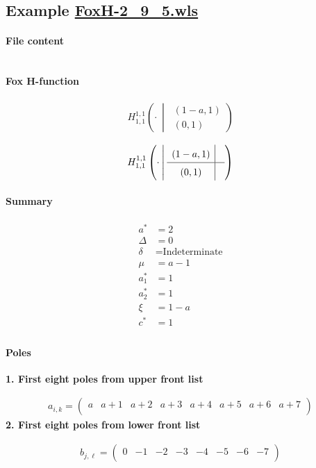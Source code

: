 \documentclass[preview]{standalone}
\newcommand{\FoxH}[5]{H_{#2}^{#1}\left(#3\:\middle\vert\: \begin{array}{l}#4\\[0.4em] #5\end{array}\right)}
\begin{document}
\subsection{Example \url{FoxH-2_9_5.wls}}

\paragraph{File content}

\inputminted{text}{../Examples/FoxH-2_9_5.wls}

\paragraph{Fox H-function}

\begin{align*}
  \FoxH
    {1,1}
    {1,1}
    {\cdot}
    {\left(1-a, 1\right)}
    {\left(0, 1\right)}
\end{align*}

\begin{align*}
  \FoxHext
    {1,1}
    {1,1}
    {\cdot}
    {\left(1-a, 1\right)}
    {}
    {\left(0, 1\right)}
    {}
\end{align*}

\paragraph{Summary}

\begin{align*}
  a^*    & = 2 \\
  \Delta & = 0 \\
  \delta & = \text{Indeterminate} \\
  \mu    & = a-1 \\
  a_1^*  & = 1 \\
  a_2^*  & = 1 \\
  \xi    & = 1-a \\
  c^*    & = 1 \\
\end{align*}

\paragraph{Poles}

\noindent\textbf{1. First eight poles from upper front list}

\begin{align*}
  a_{i,k} = 
  \left(
\begin{array}{cccccccc}
 a & a+1 & a+2 & a+3 & a+4 & a+5 & a+6 & a+7 \\
\end{array}
\right)
\end{align*}
\noindent\textbf{2. First eight poles from lower front list}

\begin{align*}
  b_{j,\ell} = 
  \left(
\begin{array}{cccccccc}
 0 & -1 & -2 & -3 & -4 & -5 & -6 & -7 \\
\end{array}
\right)
\end{align*}
\end{document}
